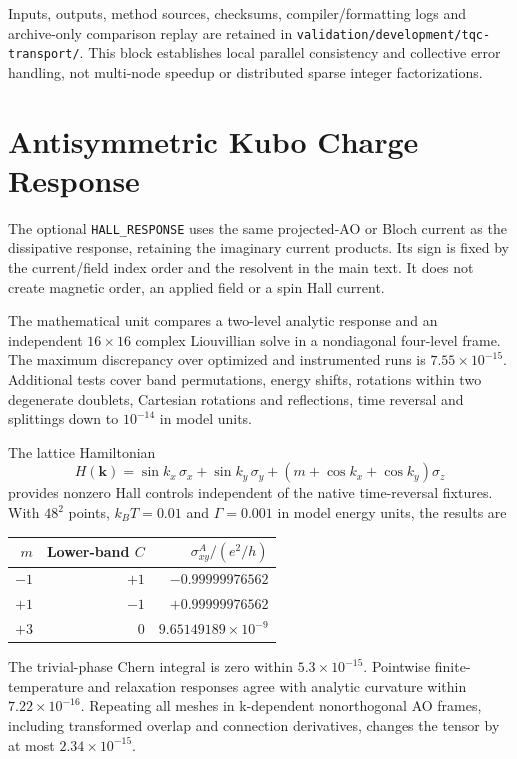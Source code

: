 \documentclass[11pt]{article}
\newcommand{\bk}{\mathbf{k}}
\begin{document}
Inputs, outputs, method sources, checksums, compiler/formatting
logs and archive-only comparison replay are retained in
\nolinkurl{validation/development/tqc-transport/}.
This block establishes local parallel consistency and collective
error handling, not multi-node speedup or distributed sparse
integer factorizations.

\section{Antisymmetric Kubo Charge Response}
\label{sec:si-kubo-hall}
The optional \texttt{HALL\_RESPONSE} uses the same projected-AO or
Bloch current as the dissipative response, retaining the imaginary
current products. Its sign is fixed by the current/field index order
and the resolvent in the main text. It does not create magnetic
order, an applied field or a spin Hall current.

The mathematical unit compares a two-level analytic response and
an independent $16\times16$ complex Liouvillian solve in a
nondiagonal four-level frame. The maximum discrepancy over optimized
and instrumented runs is $7.55\times10^{-15}$.
Additional tests cover band permutations, energy shifts, rotations
within two degenerate doublets, Cartesian rotations and reflections,
time reversal and splittings down to $10^{-14}$ in model units.

The lattice Hamiltonian
\begin{equation}
 H(\bk)=\sin k_x\,\sigma_x+\sin k_y\,\sigma_y+
 (m+\cos k_x+\cos k_y)\sigma_z
 \label{eq:si-hall-model}
\end{equation}
provides nonzero Hall controls independent of the native
time-reversal fixtures. With $48^2$ points, $k_BT=0.01$ and
$\Gamma=0.001$ in model energy units, the results are
\begin{center}
\begin{tabular}{rrr}
\toprule
$m$ & Lower-band $C$ & $\sigma^A_{xy}/(e^2/h)$\\
\midrule
$-1$ & $+1$ & $-0.99999976562$\\
$+1$ & $-1$ & $+0.99999976562$\\
$+3$ & $0$ & $9.65149189\times10^{-9}$\\
\bottomrule
\end{tabular}
\end{center}
The trivial-phase Chern integral is zero within
$5.3\times10^{-15}$. Pointwise finite-temperature and relaxation
responses agree with analytic curvature within
$7.22\times10^{-16}$.
Repeating all meshes in k-dependent nonorthogonal AO frames,
including transformed overlap and connection derivatives, changes
the tensor by at most $2.34\times10^{-15}$.
\end{document}
